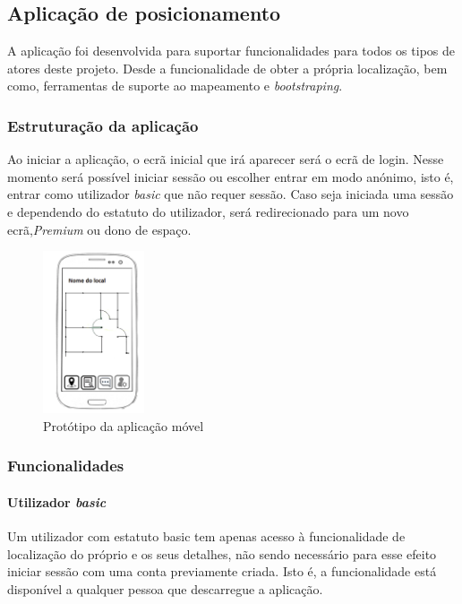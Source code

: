 \documentclass[12pt]{article} %
\begin{document}
\pagebreak

\subsection{Aplicação de posicionamento}
A aplicação foi desenvolvida para suportar funcionalidades para todos os tipos de atores deste projeto. Desde a funcionalidade de obter a própria localização, bem como, ferramentas de suporte ao mapeamento e \textit{bootstraping}.

\subsubsection{Estruturação da aplicação}
Ao iniciar a aplicação, o ecrã inicial que irá aparecer será o ecrã de login. Nesse momento será possível iniciar sessão ou escolher entrar em modo anónimo, isto é, entrar como utilizador \textit{basic} que não requer sessão. Caso seja iniciada uma sessão e dependendo do estatuto do utilizador, será redirecionado para um novo ecrã,\textit{Premium} ou dono de espaço.\par

\begin{figure}[!htbp]
		\includegraphics[width=3cm]{app.png}
		\centering
		\caption{Protótipo da aplicação móvel}

	\end{figure}

\subsubsection{Funcionalidades}

\paragraph{Utilizador \textit{basic}}
Um utilizador com estatuto basic tem apenas acesso à funcionalidade de localização do próprio e os seus detalhes, não sendo necessário para esse efeito iniciar sessão com uma conta previamente criada. Isto é, a funcionalidade está disponível a qualquer pessoa que descarregue a aplicação.\par
\end{document}
